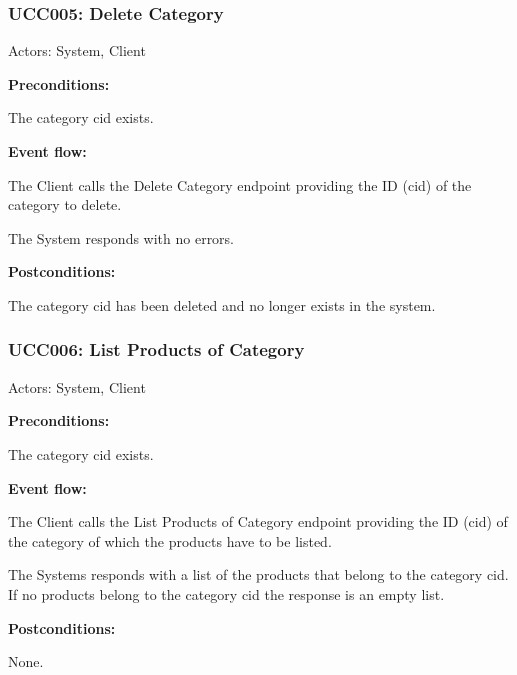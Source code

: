 \begin{ucbox}{\subsubsection{UCC005: Delete Category}}
\label{UCC005}

Actors: System, Client

\textbf{Preconditions:}

\ucitem The category cid exists.

\textbf{Event flow:}

\ucitem The Client calls the Delete Category endpoint providing the ID (cid) of the category to delete.

\ucitem The System responds with no errors.

\textbf{Postconditions:}

\ucitem The category cid has been deleted and no longer exists in the system.

\end{ucbox}

\begin{ucbox}{\subsubsection{UCC006: List Products of Category}}
\label{UCC006}

Actors: System, Client

\textbf{Preconditions:}

\ucitem The category cid exists.

\textbf{Event flow:}

\ucitem The Client calls the List Products of Category endpoint providing the ID (cid) of the category of which the products have to be listed.

\ucitem The Systems responds with a list of the products that belong to the category cid. If no products belong to the category cid the response is an empty list.

\textbf{Postconditions:}

\ucitem None.

\end{ucbox}

